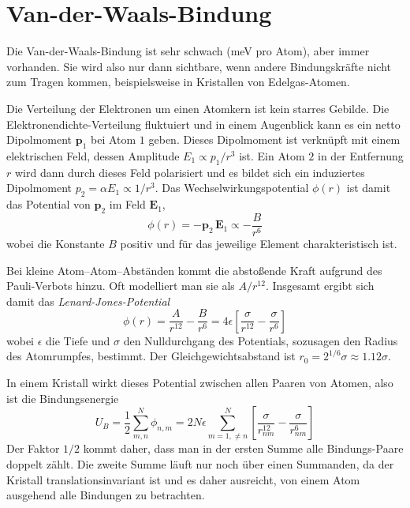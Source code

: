 \section{Van-der-Waals-Bindung}

Die Van-der-Waals-Bindung ist sehr schwach (meV pro Atom), aber immer vorhanden. Sie wird also nur dann sichtbare, wenn andere Bindungskräfte nicht zum Tragen kommen, beispielsweise in Kristallen von Edelgas-Atomen.

Die Verteilung der Elektronen um einen Atomkern ist kein starres Gebilde. Die Elektronendichte-Verteilung fluktuiert und in einem Augenblick kann es ein netto Dipolmoment $\mathbf{p}_1$ bei Atom $1$ geben. Dieses Dipolmoment ist verknüpft mit einem elektrischen Feld, dessen Amplitude $E_1 \propto p_1 / r^3$ ist. Ein Atom $2$ in der Entfernung $r$ wird dann durch dieses Feld polarisiert und es bildet sich ein induziertes Dipolmoment $p_2 = \alpha E_1 \propto 1/r^3$. Das Wechselwirkungspotential $\phi(r)$ ist damit das Potential von $\mathbf{p}_2$ im Feld $\mathbf{E}_1$, 
\begin{equation}
 \phi(r) = - \mathbf{p}_2 \, \mathbf{E}_1 \propto - \frac{B}{r^6}
\end{equation}
wobei die Konstante $B$ positiv und für das jeweilige Element charakteristisch ist.

Bei kleine Atom--Atom--Abständen kommt die abstoßende Kraft aufgrund des Pauli-Verbots hinzu. Oft modelliert man sie als $A/r^{12}$. Insgesamt ergibt sich damit das \emph{Lenard-Jones-Potential}
\begin{equation}
\phi(r) = \frac{A}{r^{12}} - \frac{B}{r^{6}} = 4 \epsilon \left[ \frac{\sigma}{r^{12}} -  \frac{\sigma}{r^{6}} \right]
\end{equation}
wobei $\epsilon$ die Tiefe und $\sigma$ den Nulldurchgang des Potentials, sozusagen den Radius des Atomrumpfes, bestimmt. Der Gleichgewichtsabstand ist $r_0 = 2^{1/6} \sigma \approx 1.12 \sigma$.

In einem Kristall wirkt dieses Potential zwischen allen Paaren von Atomen, also ist die Bindungsenergie 
\begin{equation}
U_B = \frac{1}{2} \sum_{m,n}^N \phi_{n,m} = 
2 N \epsilon \sum_{m=1,   \neq n}^N 
\left[ 
\frac{\sigma}{r_{nm}^{12}} -  \frac{\sigma}{r_{nm}^{6}} 
\right]
\end{equation}
Der Faktor $1/2$ kommt daher, dass man in der ersten Summe alle Bindungs-Paare doppelt zählt. Die zweite Summe läuft nur noch über einen Summanden, da der Kristall translationsinvariant ist und es daher ausreicht, von einem Atom ausgehend alle Bindungen zu betrachten.

